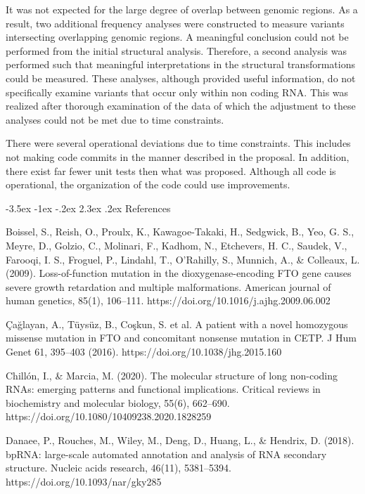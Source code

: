 \documentclass[11pt]{article}
\makeatletter
\renewcommand\section{\@startsection {section}{1}{\z@}%
                                       {-3.5ex \@plus -1ex \@minus -.2ex}%
                                       {2.3ex \@plus.2ex}%
                                       {\normalfont\fontfamily{phv}\fontsize{16}{19}\bfseries}}
\makeatother
\begin{document}
It was not expected for the large degree of overlap between genomic regions. As a result, two additional frequency analyses were constructed to measure variants intersecting overlapping genomic regions. A meaningful conclusion could not be performed from the initial structural analysis. Therefore, a second analysis was performed such that meaningful interpretations in the structural transformations could be measured. These analyses, although provided useful information, do not specifically examine variants that occur only within non coding RNA. This was realized after thorough examination of the data of which the adjustment to these analyses could not be met due to time constraints. 

There were several operational deviations due to time constraints. This includes not making code commits in the manner described in the proposal. In addition, there exist far fewer unit tests then what was proposed. Although all code is operational, the organization of the code could use improvements.

\section{References} \label{s:references}

Boissel, S., Reish, O., Proulx, K., Kawagoe-Takaki, H., Sedgwick, B., Yeo, G. S., Meyre, D., Golzio, C., Molinari, F., Kadhom, N., Etchevers, H. C., Saudek, V., Farooqi, I. S., Froguel, P., Lindahl, T., O'Rahilly, S., Munnich, A., & Colleaux, L. (2009). Loss-of-function mutation in the dioxygenase-encoding FTO gene causes severe growth retardation and multiple malformations. American journal of human genetics, 85(1), 106–111. https://doi.org/10.1016/j.ajhg.2009.06.002 

Çağlayan, A., Tüysüz, B., Coşkun, S. et al. A patient with a novel homozygous missense mutation in FTO and concomitant nonsense mutation in CETP. J Hum Genet 61, 395–403 (2016). https://doi.org/10.1038/jhg.2015.160 

Chillón, I., & Marcia, M. (2020). The molecular structure of long non-coding RNAs: emerging patterns and functional implications. Critical reviews in biochemistry and molecular biology, 55(6), 662–690. https://doi.org/10.1080/10409238.2020.1828259 

Danaee, P., Rouches, M., Wiley, M., Deng, D., Huang, L., & Hendrix, D. (2018). bpRNA: large-scale automated annotation and analysis of RNA secondary structure. Nucleic acids research, 46(11), 5381–5394. https://doi.org/10.1093/nar/gky285 
\end{document}
